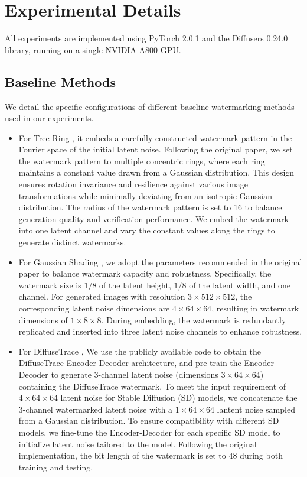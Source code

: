 
\section{Experimental Details}
All experiments are implemented using PyTorch 2.0.1 and the Diffusers 0.24.0 library, running on a single NVIDIA A800 GPU.

\subsection{Baseline Methods}
We detail the specific configurations of different baseline watermarking methods used in our experiments.
\begin{itemize}
\item{For Tree-Ring \cite{wen2023tree}, }
it embeds a carefully constructed watermark pattern in the Fourier space of the initial latent noise. Following the original paper, we set the watermark pattern to multiple concentric rings, where each ring maintains a constant value drawn from a Gaussian distribution. This design ensures rotation invariance and resilience against various image transformations while minimally deviating from an isotropic Gaussian distribution. The radius of the watermark pattern is set to 16 to balance generation quality and verification performance. We embed the watermark into one latent channel and vary the constant values along the rings to generate distinct watermarks.

\item{For Gaussian Shading \cite{yang2024gaussian},} 
we adopt the parameters recommended in the original paper to balance watermark capacity and robustness. 
Specifically, the watermark size is $1/8$ of the latent height, $1/8$ of the latent width, and one channel. For generated images with resolution $3 \times 512 \times 512$, the corresponding latent noise dimensions are $4 \times 64 \times 64$, resulting in watermark dimensions of $1 \times 8 \times 8$. During embedding, the watermark is redundantly replicated and inserted into three latent noise channels to enhance robustness.


\item{For DiffuseTrace \cite{lei2024diffusetrace}, }
We use the publicly available code to obtain the DiffuseTrace Encoder-Decoder architecture, and pre-train the Encoder-Decoder to generate 3-channel latent noise (dimensions $3 \times 64 \times 64$) containing the DiffuseTrace watermark. To meet the input requirement of $4 \times 64 \times 64$ latent noise for Stable Diffusion (SD) models, we concatenate the 3-channel watermarked latent noise with a $1 \times 64 \times 64$ lantent noise sampled from a Gaussian distribution. To ensure compatibility with different SD models, we fine-tune the Encoder-Decoder for each specific SD model to initialize latent noise tailored to the model.  Following the original implementation, the bit length of the watermark is set to 48 during both training and testing.
\end{itemize}


